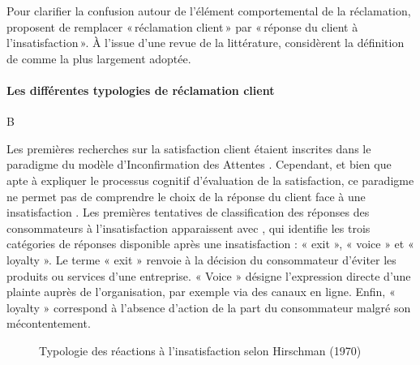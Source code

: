\documentclass[a4paper,12pt, openany]{book}
\begin{document}
Pour clarifier la confusion autour de l'élément comportemental de la réclamation, \textcite{boote98} proposent de remplacer «\,réclamation client\,» par «\,réponse du client à l'insatisfaction\,». À l'issue d'une revue de la littérature, \textcite{kitapci19} considèrent la définition de \textcite{singh88} comme la plus largement adoptée. \par


\paragraph{Les différentes typologies de réclamation client} B \parencite{hirschman70}

Les premières recherches sur la satisfaction client étaient inscrites dans le paradigme du modèle d'Inconfirmation des Attentes \parencites{olshavsky72, oliver80}. Cependant, et bien que apte à expliquer le processus cognitif d'évaluation de la satisfaction, ce paradigme ne permet pas de comprendre le choix de la réponse du client face à une insatisfaction \parencite{westbrook87}. Les premières tentatives de classification des réponses des consommateurs à l'insatisfaction apparaissent avec \textcite{hirschman70}, qui identifie les trois catégories de réponses disponible après une insatisfaction : « exit », « voice » et « loyalty ». Le terme « exit » renvoie à la décision du consommateur d'éviter les produits ou services d'une entreprise. « Voice » désigne l'expression directe d'une plainte auprès de l'organisation, par exemple via des canaux en ligne. Enfin, « loyalty » correspond à l'absence d'action de la part du consommateur malgré son mécontentement. \par 

\begin{figure}[H]
\centering
{}
\caption{Typologie des réactions à l'insatisfaction selon Hirschman (1970)}
\end{figure}
\end{document}

